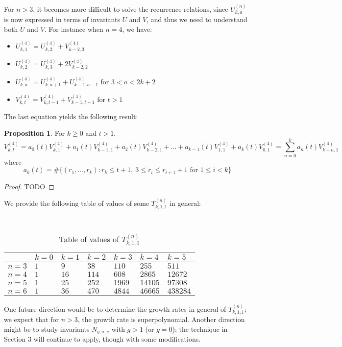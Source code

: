 \documentclass[11pt]{article}           %
\theoremstyle{definition}
\newtheorem{prop}[thm]{Proposition}
\begin{document}
For $n>3$, it becomes more difficult to solve the recurrence relations,
since $U_{k,a}^{(n)}$ is now expressed in terms of invariants $U$ and $V$,
and thus we need to understand both $U$ and $V$.
For instance when $n=4$, we have:
\begin{itemize}
\item $U_{k,1}^{(4)}=U_{k,2}^{(4)}+V_{k-2,3}^{(4)}$
\item $U_{k,2}^{(4)}=U_{k,3}^{(4)}+2V_{k-2,2}^{(4)}$
\item $U_{k,a}^{(4)}=U_{k,a+1}^{(4)}+U_{k-1,a-1}^{(4)}$ for $3<a<2k+2$
  \item $V_{k,t}^{(4)}=V_{k,t-1}^{(4)}+V_{k-1,t+1}^{(4)}$ for $t>1$
\end{itemize}
The last equation yields the following result:
\begin{prop}
  For $k\geq 0$ and $t>1$,
  \[
  V_{k,t}^{(4)}=a_0(t)V_{k,1}^{(4)}+a_1(t)V_{k-1,1}^{(4)}+a_2(t)V_{k-2,1}^{(4)}+\dots+a_{k-1}(t)V_{1,1}^{(4)}+a_k(t)V_{0,1}^{(4)}=\sum_{n=0}^k a_n(t)V_{k-n,1}^{(4)}
  \]
  where
  \[
  a_k(t)=\#\{(r_1,\dots,r_k):r_k\leq t+1,\ 3\leq r_i\leq r_{i+1}+1\text{ for }1\leq i<k\}
  \]
\end{prop}
\begin{proof}
  TODO
  \end{proof}

We provide the following table of values of some $T_{k,1,1}^{(n)}$ in general:

  \begin{table}[h]
    \caption{Table of values of $T_{k,1,1}^{(n)}$}
    \centering
    ~\\
  \begin{tabular}{l|l|l|l|l|l|l|}
    & $k=0$ & $k=1$ & $k=2$ & $k=3$ & $k=4$ & $k=5$ \\ \hline
    $n=3$ & $1$ & $9$ & $38$ & $110$ & $255$ & $511$ \\ \hline
    $n=4$ & $1$ & $16$ & $114$ & $608$ & $2865$ & $12672$ \\ \hline
    $n=5$ & $1$ & $25$ & $252$ & $1969$ & $14105$ & $97308$ \\ \hline
    $n=6$ & $1$ & $36$ & $470$ & $4844$ & $46665$ & $438284$ \\ \hline
\end{tabular}
\end{table}

One future direction would
be to determine the growth rates in general of $T_{k,1,1}^{(n)}$;
we expect that for $n>3$, the growth rate is superpolynomial.
Another direction might be to study invariants $N_{g,\sigma,\nu}$ with
$g>1$ (or $g=0$); the technique in Section 3 will continue
to apply, though with some modifications.
\end{document}
